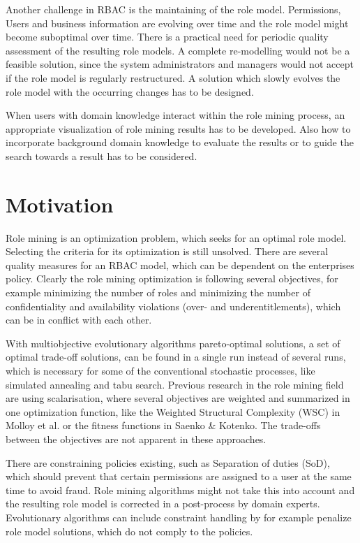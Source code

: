 Another challenge in RBAC is the maintaining of the role model. Permissions, Users and business information are evolving over time and the role model might become suboptimal over time. There is a practical need for periodic quality assessment of the resulting role models\cite{Kunz}. A complete re-modelling would not be a feasible solution, since the system administrators and managers would not accept if the role model is regularly restructured. A solution which slowly evolves the role model with the occurring changes has to be designed.

When users with domain knowledge interact within the role mining process, an appropriate visualization of role mining results has to be developed. Also how to incorporate background domain knowledge to evaluate the results or to guide the search towards a result has to be considered\cite{Han}.
\fi


\section{Motivation}
Role mining is an optimization problem, which seeks for an optimal role model. Selecting the criteria for its optimization is still unsolved. There are several quality measures for an RBAC model, which can be dependent on the enterprises policy. Clearly the role mining optimization is following several objectives, for example minimizing the number of roles and minimizing the number of confidentiality and availability violations (over- and underentitlements), which can be in conflict with each other.

With multiobjective evolutionary algorithms pareto-optimal solutions, a set of optimal trade-off solutions, can be found in a single run instead of several runs, which is necessary for some of the conventional stochastic processes, like simulated annealing and tabu search\cite{abraham2005evolutionary}. Previous research in the role mining field are using scalarisation, where several objectives are weighted and summarized in one optimization function, like the Weighted Structural Complexity (WSC) in Molloy et al.\cite{Molloy} or the fitness functions in Saenko \& Kotenko\cite{saenko2012design}. The trade-offs between the objectives are not apparent in these approaches.

There are constraining policies existing, such as Separation of duties (SoD), which should prevent that certain permissions are assigned to a user at the same time to avoid fraud. Role mining algorithms might not take this into account and the resulting role model is corrected in a post-process by domain experts. Evolutionary algorithms can include constraint handling by for example penalize role model solutions, which do not comply to the policies. 

